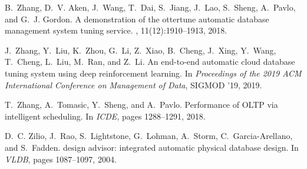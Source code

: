 \documentclass[11pt,times]{article}
\begin{document}
\begin{thebibliography}{10}
B.~Zhang, D.~V. Aken, J.~Wang, T.~Dai, S.~Jiang, J.~Lao, S.~Sheng, A.~Pavlo,
  and G.~J. Gordon.
\newblock A demonstration of the ottertune automatic database management system
  tuning service.
, 11(12):1910--1913, 2018.

J.~Zhang, Y.~Liu, K.~Zhou, G.~Li, Z.~Xiao, B.~Cheng, J.~Xing, Y.~Wang,
  T.~Cheng, L.~Liu, M.~Ran, and Z.~Li.
\newblock An end-to-end automatic cloud database tuning system using deep
  reinforcement learning.
\newblock In {\em Proceedings of the 2019 ACM International Conference on
  Management of Data}, SIGMOD '19, 2019.

T.~Zhang, A.~Tomasic, Y.~Sheng, and A.~Pavlo.
\newblock Performance of {OLTP} via intelligent scheduling.
\newblock In {\em ICDE}, pages 1288--1291, 2018.

D.~C. Zilio, J.~Rao, S.~Lightstone, G.~Lohman, A.~Storm, C.~Garcia-Arellano,
  and S.~Fadden.
 design advisor: integrated automatic physical database design.
\newblock In {\em VLDB}, pages 1087--1097, 2004.

\end{thebibliography}
\end{document}
